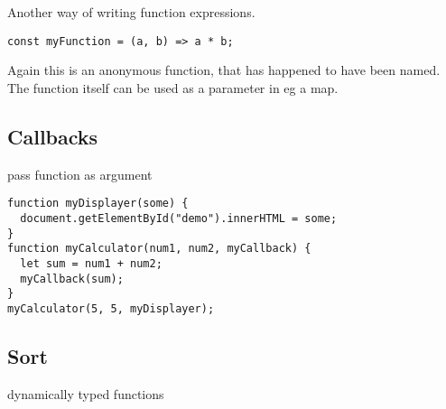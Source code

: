 Another way of writing function expressions.

\begin{verbatim}
const myFunction = (a, b) => a * b;
\end{verbatim}

Again this is an anonymous function, that has happened to have been named. The function itself can be used as a parameter in eg a map.

\subsection{Callbacks}

pass function as argument

\begin{verbatim}
function myDisplayer(some) {
  document.getElementById("demo").innerHTML = some;
}
function myCalculator(num1, num2, myCallback) {
  let sum = num1 + num2;
  myCallback(sum);
}
myCalculator(5, 5, myDisplayer);
\end{verbatim}


\subsection{Sort}
dynamically typed functions

